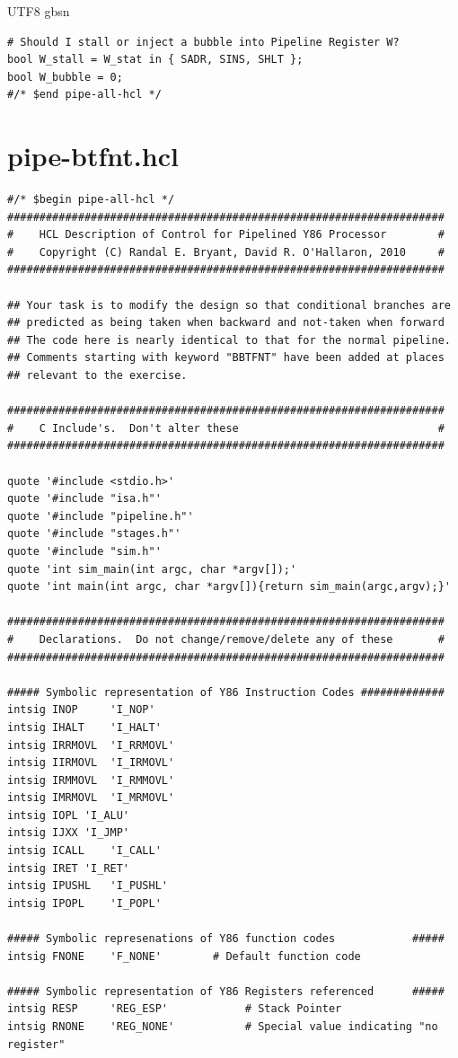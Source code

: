 \documentclass {article}
\begin{document}
\begin {CJK*} {UTF8} {gbsn}
\begin{lstlisting}
# Should I stall or inject a bubble into Pipeline Register W?
bool W_stall = W_stat in { SADR, SINS, SHLT };
bool W_bubble = 0;
#/* $end pipe-all-hcl */
			\end{lstlisting}

		\newpage
		\section{pipe-btfnt.hcl}\label{appendixB}
			\begin{lstlisting}
#/* $begin pipe-all-hcl */
####################################################################
#    HCL Description of Control for Pipelined Y86 Processor        #
#    Copyright (C) Randal E. Bryant, David R. O'Hallaron, 2010     #
####################################################################

## Your task is to modify the design so that conditional branches are
## predicted as being taken when backward and not-taken when forward
## The code here is nearly identical to that for the normal pipeline.  
## Comments starting with keyword "BBTFNT" have been added at places
## relevant to the exercise.

####################################################################
#    C Include's.  Don't alter these                               #
####################################################################

quote '#include <stdio.h>'
quote '#include "isa.h"'
quote '#include "pipeline.h"'
quote '#include "stages.h"'
quote '#include "sim.h"'
quote 'int sim_main(int argc, char *argv[]);'
quote 'int main(int argc, char *argv[]){return sim_main(argc,argv);}'

####################################################################
#    Declarations.  Do not change/remove/delete any of these       #
####################################################################

##### Symbolic representation of Y86 Instruction Codes #############
intsig INOP 	'I_NOP'
intsig IHALT	'I_HALT'
intsig IRRMOVL	'I_RRMOVL'
intsig IIRMOVL	'I_IRMOVL'
intsig IRMMOVL	'I_RMMOVL'
intsig IMRMOVL	'I_MRMOVL'
intsig IOPL	'I_ALU'
intsig IJXX	'I_JMP'
intsig ICALL	'I_CALL'
intsig IRET	'I_RET'
intsig IPUSHL	'I_PUSHL'
intsig IPOPL	'I_POPL'

##### Symbolic represenations of Y86 function codes            #####
intsig FNONE    'F_NONE'        # Default function code

##### Symbolic representation of Y86 Registers referenced      #####
intsig RESP     'REG_ESP'    	     # Stack Pointer
intsig RNONE    'REG_NONE'   	     # Special value indicating "no register"


\end{lstlisting}
\end{CJK*}
\end{document}
